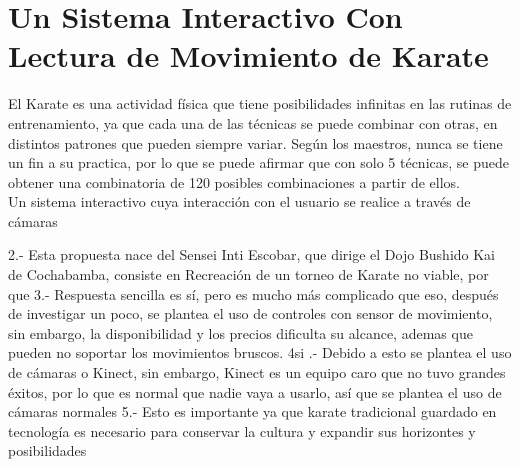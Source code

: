 \section{Un Sistema Interactivo Con Lectura de Movimiento de Karate}

El Karate es una actividad física que tiene posibilidades infinitas en las rutinas de entrenamiento, ya que cada una de las técnicas se puede combinar con otras, en distintos patrones que pueden siempre variar. Según los maestros, nunca se tiene un fin a su practica, por lo que se puede afirmar que con solo 5 técnicas, se puede obtener una combinatoria de 120 posibles combinaciones a partir de ellos.\\

Un sistema interactivo\cite{esposito2005shorts} cuya interacción con el usuario se realice a través de cámaras




2.- Esta propuesta nace del Sensei Inti Escobar, que dirige el Dojo Bushido Kai de Cochabamba, consiste en  Recreación de un torneo de Karate no viable, por que
3.- Respuesta sencilla es sí, pero es mucho más complicado que eso, después de investigar un poco, se plantea el uso de controles con sensor de movimiento, sin embargo, la disponibilidad y los precios dificulta su alcance, ademas que pueden no soportar los movimientos bruscos.
4si .- Debido a esto se plantea el uso de cámaras o Kinect, sin embargo, Kinect es un equipo caro que no tuvo grandes éxitos, por lo que es normal que nadie vaya a usarlo, así que se plantea el uso de cámaras normales
5.- Esto es importante ya que karate tradicional guardado en tecnología es necesario para conservar la cultura y expandir sus horizontes y posibilidades

















